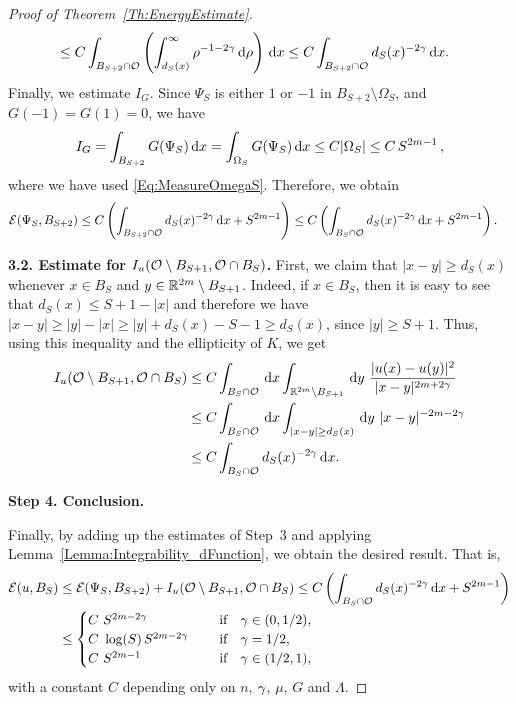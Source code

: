 \begin{proof}[Proof of Theorem~\ref{Th:EnergyEstimate}]
\begin{align*}
&\leq C \int_{B_{S+2} \cap \mathcal{O}} \left(\int_{d_S(x)}^\infty \rho^{-1-2\gamma} \,\mathrm{d} \rho \right)\,\mathrm{d} x \leq C \int_{B_{S+2} \cap \mathcal{O}} d_S(x)^{-2\gamma} \,\mathrm{d} x.
\end{align*}
Finally, we estimate $I_G$. Since $\Psi_S$ is either $1$ or $-1$ in $B_{S+2}\setminus \Omega_S$, and $G(-1)=G(1)=0$, we have
\begin{align*}
I_G = \int_{B_{S+2}} G(\Psi_S) \,\mathrm{d} x= \int_{\Omega_S} G(\Psi_S)\,\mathrm{d} x \leq C | \Omega_S| \leq C\,S^{2m-1}\,,
\end{align*}
where we have used \eqref{Eq:MeasureOmegaS}. Therefore, we obtain
\begin{align*}
\mathcal{E}(\Psi_S,B_{S+2}) &\leq C \left(\int_{B_{S+2} \cap \mathcal{O}} d_S(x)^{-2\gamma} \,\mathrm{d} x + S^{2m-1} \right)\leq C\left(\int_{B_{S} \cap \mathcal{O}} d_S(x)^{-2\gamma} \,\mathrm{d} x + S^{2m-1} \right).
\end{align*}


\textbf{3.2. Estimate for $I_u(\mathcal{O} \setminus B_{S+1}, \mathcal{O} \cap B_S)$.} First, we claim that $|x-y|\geq d_S(x)$ whenever $x\in B_S$ and $y\in \mathbb{R}^{2m}\setminus B_{S+1}$. Indeed, if $x\in B_S$, then it is easy to see that $d_S(x) \leq S+1-|x|$ and therefore we have $|x-y|\geq |y|-|x|\geq |y|+d_S(x)-S-1 \geq  d_S(x)$, since $|y| \geq S+1$. Thus, using this inequality and the ellipticity of $K$, we get
\begin{align*}
I_u(\ocal \setminus B_{S+1}, \ocal \cap B_S) &\leq C \int_{B_S \cap \ocal} \d x \int_{\R^{2m}\setminus B_{S+1}} \d y \ \frac{|u(x)-u(y)|^2}{|x-y|^{2m+2\s}} \\
& \leq C \int_{B_S \cap \ocal} \d x \int_{|x-y|\geq d_S(x)} \d y \ |x-y|^{-2m-2\s} \\
&\leq C \int_{B_S \cap \ocal} d_S(x)^{-2\s} \d x.
\end{align*}

\textbf{Step 4. Conclusion.}

Finally, by adding up the estimates of Step~3 and applying Lemma~\ref{Lemma:Integrability_dFunction}, we obtain the desired result. That is,
\begin{align*}
\mathcal{E}(u,B_S) &\leq \mathcal{E}(\Psi_S,B_{S+2}) + I_u(\mathcal{O} \setminus B_{S+1}, \mathcal{O} \cap B_S) \leq C\left(\int_{B_S \cap \mathcal{O}} d_S(x)^{-2\gamma} \,\mathrm{d} x + S^{2m-1} \right)\\
&\leq \begin{cases}
C \ S^{2m-2\gamma}\ \ \ &\textrm{if } \ \ \gamma\in(0,1/2),\\
C\ \log(S)\,S^{2m-2\gamma}\ \ \ \ &\textrm{if } \ \ \gamma=1/2,\\
C \ S^{2m-1}\ \ \ \ &\textrm{if } \ \ \gamma\in(1/2,1),\\
\end{cases}
\end{align*}
with a constant $C$ depending only on $n$, $\gamma$, $\mu$, $G$ and $\Lambda$. 


\end{proof}

